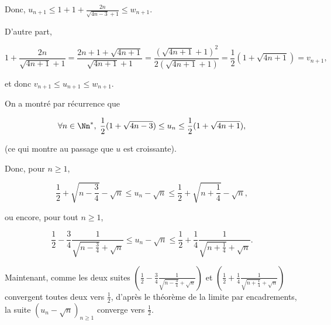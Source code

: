 {{Donc, $u_{n+1}\leq 1+1+\frac{2n}{\sqrt{4n-3}+1}\leq w_{n+1}$.

D'autre part,

$$1+\frac{2n}{\sqrt{4n+1}+1}=\frac{2n+1+\sqrt{4n+1}}{\sqrt{4n+1}+1}=\frac{(\sqrt{4n+1}+1)^2}{2(\sqrt{4n+1}+1)}
=\frac{1}{2}(1+\sqrt{4n+1})=v_{n+1},$$ 

et donc $v_{n+1}\leq u_{n+1}\leq w_{n+1}$.

On a montré par récurrence que 

$$\forall n\in\Nn^*,\;\frac{1}{2}(1+\sqrt{4n-3})\leq u_n\leq\frac{1}{2}(1+\sqrt{4n+1}),$$

(ce qui montre au passage que $u$ est croissante).

Donc, pour $n\geq1$,

$$\frac{1}{2}+\sqrt{n-\frac{3}{4}}-\sqrt{n}\leq u_n-\sqrt{n}\leq\frac{1}{2}+\sqrt{n+\frac{1}{4}}-\sqrt{n},$$

ou encore, pour tout $n\geq1$,
 
$$\frac{1}{2}-\frac{3}{4}\frac{1}{\sqrt{n-\frac{3}{4}}+\sqrt{n}}\leq u_n-\sqrt{n}\leq\frac{1}{2}+\frac{1}{4}\frac{1}{\sqrt{n+\frac{1}{4}}+\sqrt{n}}.$$

Maintenant, comme les deux suites 
$(\frac{1}{2}-\frac{3}{4}\frac{1}{\sqrt{n-\frac{3}{4}}+\sqrt{n}})$ et $(\frac{1}{2}+\frac{1}{4}\frac{1}{\sqrt{n+\frac{1}{4}}+\sqrt{n}})$ convergent toutes deux vers $\frac{1}{2}$, d'après le théorème de la limite par encadrements, la suite $(u_n-\sqrt{n})_{n\geq1}$ converge vers $\frac{1}{2}$.
}
}
